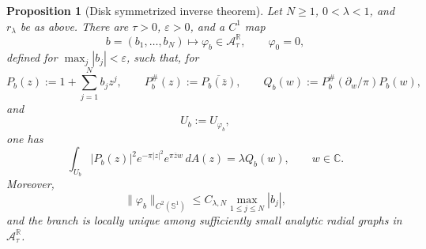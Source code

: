 \documentclass[a4paper,11pt,reqno]{amsart}
\numberwithin{equation}{section}
\theoremstyle{plain} %
\newtheorem{proposition}{Proposition}[section]
\theoremstyle{definition} %
\theoremstyle{remark}
\newcommand{\R}{\mathbb{R}}
\newcommand{\C}{\mathbb{C}}
\begin{document}
\begin{proposition}[Disk symmetrized inverse theorem]\label{prop:disk-inverse-tailored}
Let \(N\ge1\), \(0<\lambda<1\), and \(r_\lambda\) be as above. There are
\(\tau>0\), \(\varepsilon>0\), and a \(C^1\) map
\[
b=(b_1,\ldots,b_N)\longmapsto \varphi_b\in\mathcal A_\tau^\R,
\qquad
\varphi_0=0,
\]
defined for \(\max_j|b_j|<\varepsilon\), such that, for
\[
P_b(z):=1+\sum_{j=1}^N b_jz^j,
\qquad
P_b^\#(z):=\overline{P_b(\overline z)},
\qquad
Q_b(w):=P_b^\#(\partial_w/\pi)P_b(w),
\]
and
\[
U_b:=U_{\varphi_b},
\]
one has
\begin{equation}\label{eq:disk-inverse-identity}
\int_{U_b}|P_b(z)|^2e^{-\pi |z|^2}e^{\pi\overline z w}\,dA(z)
=
\lambda Q_b(w),
\qquad w\in\C .
\end{equation}
Moreover,
\[
\|\varphi_b\|_{C^2(\mathbb S^1)}
\le C_{\lambda,N}\max_{1\le j\le N}|b_j|,
\]
and the branch is locally unique among sufficiently small analytic radial
graphs in \(\mathcal A_\tau^\R\).
\end{proposition}
\end{document}

